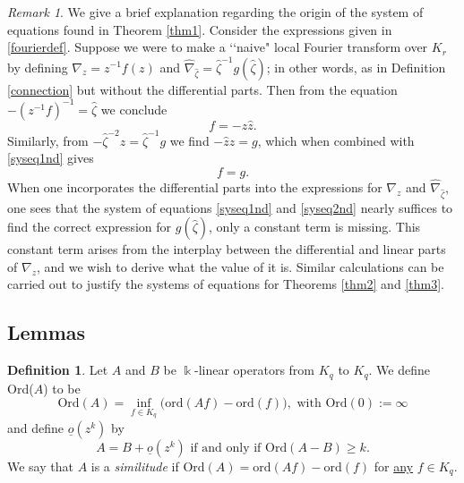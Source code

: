 \documentclass[11pt]{amsart}
\theoremstyle{plain}
\theoremstyle{definition}
\newtheorem{definition}[theorem]{Definition}
\theoremstyle{remark}
\newtheorem*{remark}{Remark}
\def\d{\displaystyle}
\def\z{\hat{\zeta}}
\begin{document}
\begin{remark} We give a brief explanation regarding the origin of the system of equations found in Theorem \ref{thm1}.  Consider the expressions given in \eqref{fourierdef}.  Suppose we were to make a \lq\lq naive" local Fourier transform over $K_r$ by defining $\nabla_z=z^{-1}f(z)$ and $\hat{\nabla}_{\z}=\z^{-1}g(\z)$; in other words, as in Definition \ref{connection} but without the differential parts.  Then from the equation $-(z^{-1}f)^{-1}=\z$ we conclude
\begin{equation}\label{syseq1nd}
f=-z\hat{z}.
\end{equation}Similarly, from $-\z^{-2}z=\z^{-1}g$ we find
$-\hat{z} z=g$, which when combined with \eqref{syseq1nd} gives
\begin{equation}\label{syseq2nd}
f=g.
\end{equation}When one incorporates the differential parts into the expressions for $\nabla_{z}$ and $\hat{\nabla}_{\z}$, one sees that the system of equations \eqref{syseq1nd} and \eqref{syseq2nd} nearly suffices to find the correct expression for $g(\z)$, only a constant term is missing.  This constant term arises from the interplay between the differential and linear parts of $\nabla_{z}$, and we wish to derive what the value of it is.  Similar calculations can be carried out to justify the systems of equations for Theorems \ref{thm2} and \ref{thm3}.
\end{remark}


\subsection{Lemmas}\label{subsec lemmas}

 \begin{definition} Let $A$ and $B$ be $\Bbbk$-linear operators from $K_q$ to $K_q$.
We define Ord($A$) to be
$$\d{\text{Ord}(A)=\inf_{f\in K_q}\big(\text{ord}(Af)-\text{ord}(f)\big), \text{ with Ord}(0):=\infty}$$ and define $\underline{o}(z^k)$ by $$A=B+\underline{o}(z^k) \text{  if and only if  } \text{Ord}(A-B)\geq k.$$
We say that $A$ is a \emph{similitude} if $\text{Ord}(A)=\text{ord}(Af)-\text{ord}(f)$ for \underline{any} $f\in K_q$.
\end{definition}
\end{document}
